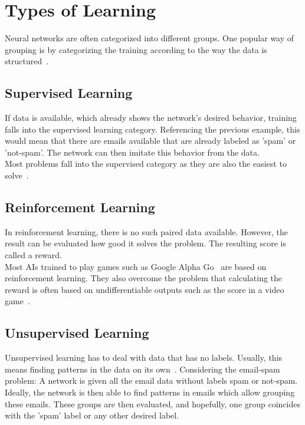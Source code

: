 \section{Types of Learning}
Neural networks are often categorized into different groups.
One popular way of grouping is by categorizing the training according to the way the data is structured~\cite{grosse}.

\subsection{Supervised Learning}
If data is available, which already shows the network's desired behavior, training falls into the supervised learning category.
Referencing the previous example, this would mean that there are emails available that are already labeled as 'spam' or 'not-spam'.
The network can then imitate this behavior from the data. \\
Most problems fall into the supervised category as they are also the easiest to solve~\cite{grosse}.

\subsection{Reinforcement Learning}
In reinforcement learning, there is no such paired data available.
However, the result can be evaluated how good it solves the problem.
The resulting score is called a reward.\\
Most AIs trained to play games such as Google Alpha Go~\cite{alphago} are based on reinforcement learning.
They also overcome the problem that calculating the reward is often based on undifferentiable outputs such as the score in a video game~\cite{grosse}.

\subsection{Unsupervised Learning}
Unsupervised learning has to deal with data that has no labels.
Usually, this means finding patterns in the data on its own~\cite{grosse}.
Considering the email-spam problem: A network is given all the email data without labels spam or not-spam.
Ideally, the network is then able to find patterns in emails which allow grouping these emails.
These groups are then evaluated, and hopefully, one group coincides with the 'spam' label or any other desired label.

